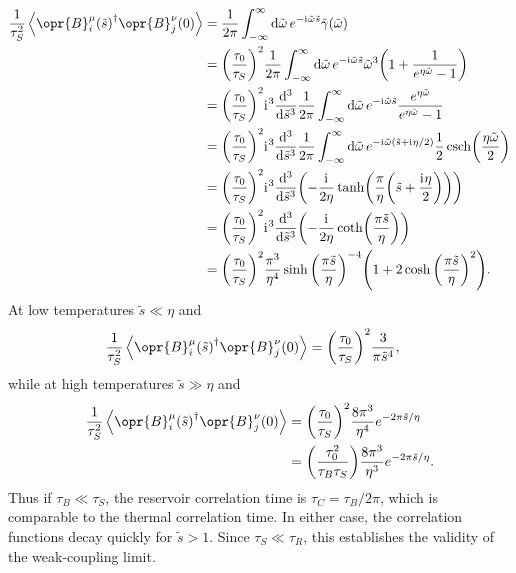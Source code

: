 \documentclass[../thesis.tex]{subfiles}
\begin{document}
\begin{align}
  \frac{1}{\tau_S^2}\ev{\opr{B}_i^\mu{(\tilde{s})}^\dag\opr{B}_j^\nu(0)}
  &= \frac{1}{2\pi}\int_{-\infty}^\infty \dd{\tilde{\omega}}
  e^{-\im\tilde{\omega} \tilde{s}}
  \tilde{\gamma}(\tilde{\omega})
  \\
  &= {\qty(\frac{\tau_0}{\tau_S})}^2 \frac{1}{2\pi}
  \int_{-\infty}^\infty \dd{\tilde{\omega}}
  e^{-\im\tilde{\omega} \tilde{s}}
  \tilde{\omega}^3
  \qty(1 + \frac{1}{e^{\eta\tilde{\omega}} - 1})
  \\
  &= {\qty(\frac{\tau_0}{\tau_S})}^2 
  \im^3 \dv[3]{\tilde{s}}
  \frac{1}{2\pi} \int_{-\infty}^\infty \dd{\tilde{\omega}}
  e^{-\im\tilde{\omega} \tilde{s}}
  \frac{e^{\eta \tilde{\omega}}}{e^{\eta \tilde{\omega}} - 1}
  \\
  &= {\qty(\frac{\tau_0}{\tau_S})}^2 
  \im^3 \dv[3]{\tilde{s}}
  \frac{1}{2\pi} \int_{-\infty}^\infty \dd{\tilde{\omega}}
  e^{-\im\tilde{\omega} (\tilde{s} + \im\eta / 2)}
  \frac{1}{2}\csch(\frac{\eta \tilde{\omega}}{2})
  \\
  &= {\qty(\frac{\tau_0}{\tau_S})}^2 
  \im^3 \dv[3]{\tilde{s}} \qty(%
  -\frac{\im}{2\eta}\tanh(\frac{\pi}{\eta}\qty(\tilde{s} + \frac{\im\eta}{2}))
  )
  \\
  &= {\qty(\frac{\tau_0}{\tau_S})}^2 
  \im^3 \dv[3]{\tilde{s}}
  \qty(-\frac{\im}{2\eta}\coth(\frac{\pi\tilde{s}}{\eta}))
  \\
  &= {\qty(\frac{\tau_0}{\tau_S})}^2 \frac{\pi^3}{\eta^4}
  \sinh{\qty(\frac{\pi \tilde{s}}{\eta})}^{-4} \qty(%
  1 + 2\cosh{\qty(\frac{\pi\tilde{s}}{\eta})}^2
  ).
\end{align}
At low temperatures $\tilde{s} \ll \eta$ and
\begin{align}
  \frac{1}{\tau_S^2}\ev{\opr{B}_i^\mu{(\tilde{s})}^\dag\opr{B}_j^\nu(0)}
  &= {\qty(\frac{\tau_0}{\tau_S})}^2 \frac{3}{\pi \tilde{s}^4},
\end{align}
while at high temperatures $\tilde{s} \gg \eta$ and
\begin{align}
  \frac{1}{\tau_S^2}\ev{\opr{B}_i^\mu{(\tilde{s})}^\dag\opr{B}_j^\nu(0)}
  &= {\qty(\frac{\tau_0}{\tau_S})}^2 \frac{8\pi^3}{\eta^4}
  e^{-2\pi\tilde{s} / \eta} \\
  &= \qty(\frac{\tau_0^2}{\tau_B \tau_S}) \frac{8\pi^3}{\eta^3}
  e^{-2\pi\tilde{s} / \eta}.
\end{align}
Thus if $\tau_B \ll \tau_S$, the reservoir correlation time is $\tau_C = \tau_B
/ 2\pi$, which is comparable to the thermal correlation time. In either case,
the correlation functions decay quickly for $\tilde{s} > 1$. Since $\tau_S \ll
\tau_R$, this establishes the validity of the weak-coupling limit.
\end{document}
